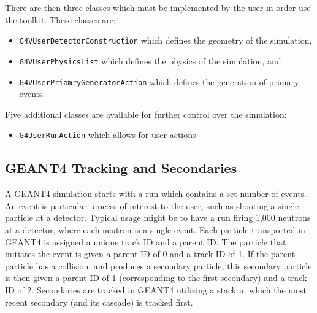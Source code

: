 There are then three classes which must be implemented by the user in order use the toolkit. These classes are:
\begin{itemize}
    \item \verb+G4VUserDetectorConstruction+ which defines the geometry of the simulation,
    \item \verb+G4VUserPhysicsList+ which defines the physics of the simulation, and
    \item \verb+G4VUserPriamryGeneratorAction+ which defines the generation of primary events.
\end{itemize}
Five additional classes are available for further control over the simulation:
\begin{itemize}
    \item \verb+G4UserRunAction+ which allows for user actions
\end{itemize}
\subsection{GEANT4 Tracking and Secondaries}

A GEANT4 simulation starts with a run which contains a set number of events.
An event is particular process of interest to the user, such as shooting a single particle at a detector. 
Typical usage might be to have a run firing 1,000 neutrons at a detector, where each neutron is a single event.
Each particle transported in GEANT4 is assigned a unique track ID and a parent ID.
The particle that initiates the event is given a parent ID of 0 and a track ID of 1.
If the parent particle has a collision, and produces a secondary particle, this secondary particle is then given a parent ID of 1 (corresponding to the first secondary) and a track ID of 2.
Secondaries are tracked in GEANT4 utilizing a stack in which the most recent secondary (and its cascade) is tracked first.

